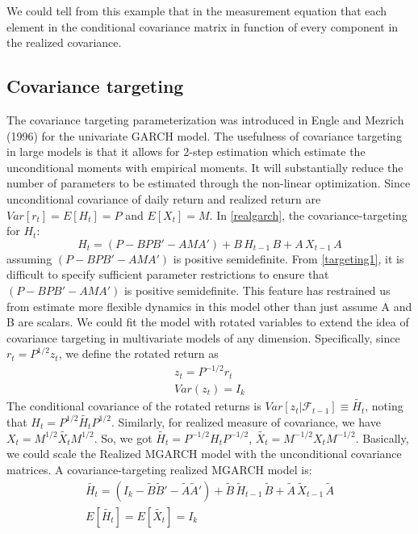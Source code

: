 \documentclass[titlepage,11pt]{article}
\begin{document}
We could tell from this example that in the measurement equation that each element in the conditional covariance matrix in function of every component in the realized covariance. 




\subsection{Covariance targeting}
The covariance targeting parameterization was introduced in Engle and Mezrich (1996) for the univariate GARCH model. The usefulness of covariance targeting in large models is that it allows for 2-step estimation which estimate the unconditional moments with empirical moments. It will substantially reduce the number of parameters to be estimated through the non-linear optimization.
Since unconditional covariance of daily return and realized return are $Var[r_t]=E[H_t]=P$ and $E[X_t]=M$. In \ref{realgarch}, the covariance-targeting for $H_t$:
\begin{equation}
\label{targeting1}
H_t=(P-BPB'-AMA')+ B\,  H_{t-1} \,B+A \,  X_{t-1} \, A
\end{equation}
assuming $(P-BPB'-AMA')$ is positive semidefinite. From \ref{targeting1}, it is difficult to specify sufficient parameter restrictions to ensure that $(P-BPB'-AMA')$ is positive semidefinite. This feature has restrained us from estimate more flexible dynamics in this model other than just assume A and B are scalars.
We could fit the model with rotated variables to extend the idea of covariance targeting in multivariate models of any dimension. Specifically, since $r_t = P^{1/2}z_t$, we define the rotated return as 
\begin{align}
\label{rotate}
z_t = P^{-1/2}r_t \nonumber \\
Var(z_t)=I_k
\end{align}
The conditional covariance of the rotated returns is $Var[z_t|\mathcal{F}_{t-1}]\equiv \tilde{H_t}$, noting that $H_t = P^{1/2}\tilde{H_t}P^{1/2}$. Similarly, for realized measure of covariance, we have $X_t = M^{1/2}\tilde{X_t}M^{1/2}$. So, we got $\tilde{H_t} = P^{-1/2} H_t P^{-1/2}$, $\tilde{X_t} = M^{-1/2} X_t M^{-1/2}$. Basically, we could scale the Realized MGARCH model with the unconditional covariance matrices. A covariance-targeting realized MGARCH model is:
\begin{align}
\label{targeting2}
\tilde{H_t}=(I_k-\tilde{B}\tilde{B}'-\tilde{A}\tilde{A}')+ \tilde{B}\,  \tilde{H}_{t-1} \,\tilde{B} + \tilde{A} \,  \tilde{X}_{t-1} \, \tilde{A}  \\
E[\tilde{H_t}]=E[\tilde{X_t}]=I_k \nonumber
\end{align}
\end{document}
